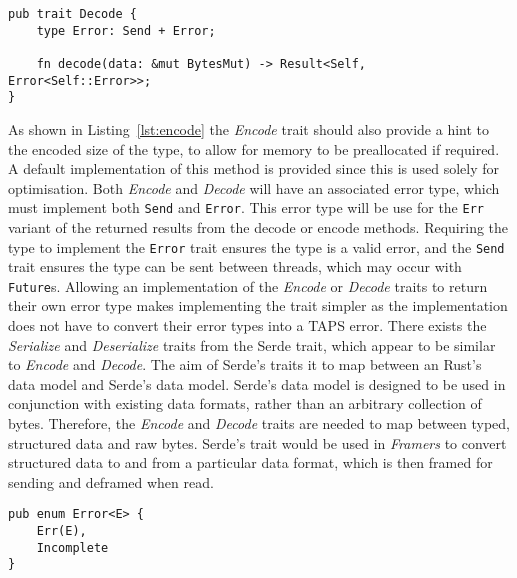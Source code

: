 \begin{lstlisting}[float=h, label=lst:decode, caption={The Decode trait.}]
pub trait Decode {
    type Error: Send + Error;

    fn decode(data: &mut BytesMut) -> Result<Self, Error<Self::Error>>;
}
\end{lstlisting}

As shown in Listing~\ref{lst:encode} the \emph{Encode} trait should also provide a hint to the encoded size of the type,
to allow for memory to be preallocated if required.
A default implementation of this method is provided since this is used solely for optimisation.
Both \emph{Encode} and \emph{Decode} will have an associated error type, which must implement both \texttt{Send} and
\texttt{Error}.
This error type will be use for the \texttt{Err} variant of the returned results from the decode or encode methods.
Requiring the type to implement the \texttt{Error} trait ensures the type is a valid error, and the \texttt{Send} trait
ensures the type can be sent between threads, which may occur with \texttt{Future}s.
Allowing an implementation of the \emph{Encode} or \emph{Decode} traits to return their own error type makes
implementing the trait simpler as the implementation does not have to convert their error types into a TAPS error.
There exists the \emph{Serialize} and \emph{Deserialize} traits from the Serde trait, which appear to be similar to
\emph{Encode} and \emph{Decode}.
The aim of Serde's traits it to map between an Rust's data model and Serde's data model.
Serde's data model is designed to be used in conjunction with existing data formats, rather than an arbitrary collection
of bytes.
Therefore, the \emph{Encode} and \emph{Decode} traits are needed to map between typed, structured data and raw bytes.
Serde's trait would be used in \emph{Framers} to convert structured data to and from a particular data format, which is
then framed for sending and deframed when read.

\begin{lstlisting}[float=h, label=lst:codecError, caption={The Error type for deframe and decode methods,
showing the Incomplete varient.
It is often aliased to DecodeError.}]
pub enum Error<E> {
    Err(E),
    Incomplete
}
\end{lstlisting}

